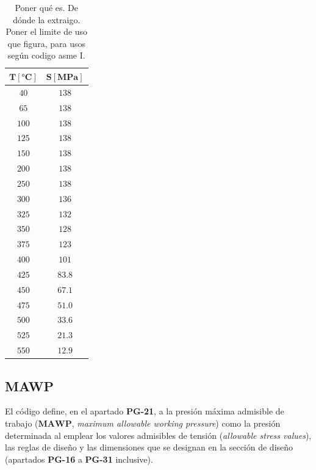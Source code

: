 \begin{table}[!ht]
     \centering
     \begin{tabular}{cc}
         \hline
         $\mathbf{T \left[\si{\celsius}\right]}$ & $\mathbf{S \left[\si{MPa}\right]}$ \\
         \hline
         $\num{40}$ & $\num{138}$ \\
         \hline
         $\num{65}$ & $\num{138}$ \\
         \hline
         $\num{100}$ & $\num{138}$ \\
         \hline
         $\num{125}$ & $\num{138}$ \\
         \hline
         $\num{150}$ & $\num{138}$ \\
         \hline
         $\num{200}$ & $\num{138}$ \\
         \hline
         $\num{250}$ & $\num{138}$ \\
         \hline
         $\num{300}$ & $\num{136}$ \\
         \hline
         $\num{325}$ & $\num{132}$ \\
         \hline
         $\num{350}$ & $\num{128}$ \\
         \hline
         $\num{375}$ & $\num{123}$ \\
         \hline
         $\num{400}$ & $\num{101}$ \\
         \hline
         $\num{425}$ & $\num{83.8}$ \\
         \hline
         $\num{450}$ & $\num{67.1}$ \\
         \hline
         $\num{475}$ & $\num{51.0}$ \\
         \hline
         $\num{500}$ & $\num{33.6}$ \\
         \hline
         $\num{525}$ & $\num{21.3}$ \\
         \hline
         $\num{550}$ & $\num{12.9}$ \\
         \hline
     \end{tabular}
     \caption{Poner qué es. De dónde la extraigo. Poner el limite de uso que figura, para usos según codigo asme I.}
     \label{tb:SA_516_70_S_value}
 \end{table}

\subsection{MAWP}

El código define, en el apartado \textbf{PG-21}, a la presión máxima admisible de trabajo ($\mathbf{MAWP}$, \textit{maximum allowable working pressure}) como la presión determinada al emplear los valores admisibles de tensión (\textit{allowable stress values}), las reglas de diseño y las dimensiones que se designan en la sección de diseño (apartados \textbf{PG-16} a \textbf{PG-31} inclusive).

